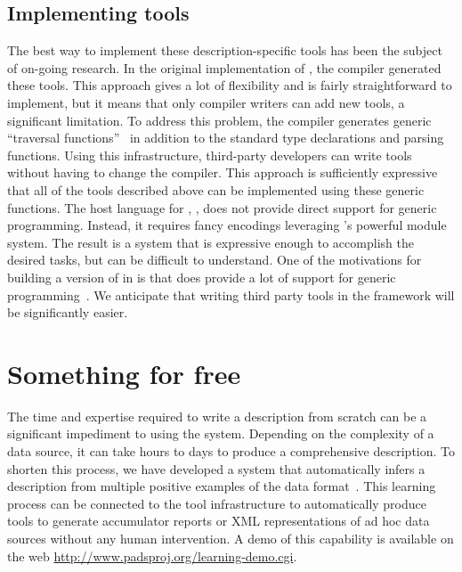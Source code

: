 \documentclass{sig-alternate}
\begin{document}
\subsection{Implementing tools}
The best way to implement these description-specific tools has been
the subject of on-going research.  In the original implementation of
\pads{}, the compiler generated these tools.  This approach gives a
lot of flexibility and is fairly straightforward to implement, but it
means that only compiler writers can add new tools, a significant
limitation.  To address this problem, the \padsml{} compiler generates
generic ``traversal functions''~\cite{mandelbaum+:pads-ml,fernandez+:padl} 
in addition to the standard type declarations and parsing functions.
Using this infrastructure, third-party developers can write tools
without having to change the compiler.  This approach is sufficiently
expressive that all of the tools described above can be implemented
using these generic functions.  The host language for \padsml,
\ocaml{}, does not provide direct support for generic programming.
Instead, it requires fancy encodings leveraging \ocaml{}'s powerful
module system.  The result is a system that is expressive enough to
accomplish the desired tasks, but can be difficult to understand.  One
of the motivations for building a version of \pads{} in \haskell{} is
that \haskell{} does provide a lot of support for generic
programming~\cite{Wadler+:typeclass,Lammel+:syb}.  We anticipate that
writing third party tools in the \padshaskell{} framework will be
significantly easier.

\section{Something for free}
\label{sec:inference}
The time and expertise required to write a \pads{} description from
scratch can be a significant impediment to using the system.
Depending on the complexity of a data source, it can take hours to
days to produce a comprehensive \pads{} description.  To shorten this
process, we have developed a system that automatically infers a
\pads{} description from multiple positive examples of the data
format~\cite{Fisher+:dirttoshovels}.  This learning process can be
connected to the \pads{} tool infrastructure to automatically produce
tools to generate accumulator reports or XML representations of ad hoc
data sources without any human intervention.  A demo of this
capability is available on the web
\url{http://www.padsproj.org/learning-demo.cgi}. 
\end{document}
